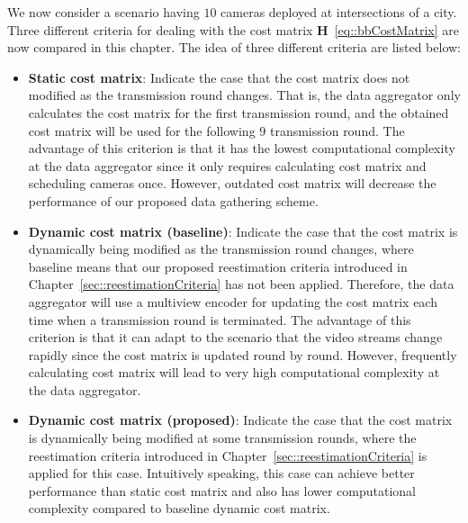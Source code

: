 We now consider a scenario having $10$ cameras deployed at intersections of a city.
Three different criteria for dealing with the cost matrix $\mathbf{H}$~\eqref{eq::bbCostMatrix} are now compared in this chapter.
The idea of three different criteria are listed below:
\begin{itemize}
\item \textbf{Static cost matrix}: Indicate the case that the cost matrix does not modified as the transmission round changes.
That is, the data aggregator only calculates the cost matrix for the first transmission round, and the obtained cost matrix will be used for the following $9$ transmission round.
The advantage of this criterion is that it has the lowest computational complexity at the data aggregator since it only requires calculating cost matrix and scheduling cameras once.
However, outdated cost matrix will decrease the performance of our proposed data gathering scheme.
\item \textbf{Dynamic cost matrix (baseline)}: Indicate the case that the cost matrix is dynamically being modified as the transmission round changes, where baseline means that our proposed reestimation criteria introduced in Chapter~\ref{sec::reestimationCriteria} has not been applied.
Therefore, the data aggregator will use a multiview encoder for updating the cost matrix each time when a transmission round is terminated.
The advantage of this criterion is that it can adapt to the scenario that the video streams change rapidly since the cost matrix is updated round by round.
However, frequently calculating cost matrix will lead to very high computational complexity at the data aggregator.
\item \textbf{Dynamic cost matrix (proposed)}:
Indicate the case that the cost matrix is dynamically being modified at some transmission rounds, where the reestimation criteria introduced in Chapter~\ref{sec::reestimationCriteria} is applied for this case.
Intuitively speaking, this case can achieve better performance than static cost matrix and also has lower computational complexity compared to baseline dynamic cost matrix.
\end{itemize}

